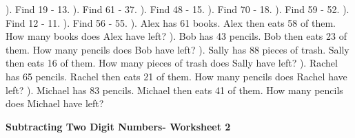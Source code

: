 \documentclass{article}%
\begin{document}
). Find 19 {-} 13.%
\newline%
\newline%
). Find 61 {-} 37.%
\newline%
\newline%
). Find 48 {-} 15.%
\newline%
\newline%
). Find 70 {-} 18.%
\newline%
\newline%
). Find 59 {-} 52.%
\newline%
\newline%
). Find 12 {-} 11.%
\newline%
\newline%
). Find 56 {-} 55.%
\newline%
\newline%
). Alex has 61 books. Alex then eats 58 of them. How many books does Alex have left?%
\newline%
\newline%
). Bob has 43 pencils. Bob then eats 23 of them. How many pencils does Bob have left?%
\newline%
\newline%
). Sally has 88 pieces of trash. Sally then eats 16 of them. How many pieces of trash does Sally have left?%
\newline%
\newline%
). Rachel has 65 pencils. Rachel then eats 21 of them. How many pencils does Rachel have left?%
\newline%
\newline%
). Michael has 83 pencils. Michael then eats 41 of them. How many pencils does Michael have left?%
\newline%
\newline%
\newline%
\pagebreak%
\large%
\begin{center}%
\textbf{Subtracting Two Digit Numbers- Worksheet 2}%
\newline%
\end{center} \normalsize%
\end{document}

